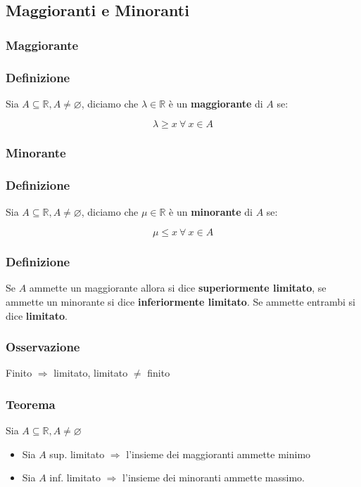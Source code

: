     \subsection{Maggioranti e Minoranti}
    \subsubsection{Maggiorante}
    \subsubsection*{Definizione}
    Sia $A \subseteq \mathbb{R}, A \neq \varnothing$, diciamo che $\lambda \in \mathbb{R}$ è un \textbf{maggiorante} di $A$ se:
    \begin{Large}
        \[
            \lambda \geq x\ \forall\ x \in A    
        \]
    \end{Large}
    \subsubsection{Minorante}
    \subsubsection*{Definizione}
    Sia $A \subseteq \mathbb{R}, A \neq \varnothing$, diciamo che $\mu \in \mathbb{R}$ è un \textbf{minorante} di $A$ se:
    \begin{Large}
        \[
            \mu \leq x\ \forall\ x \in A
        \]
    \end{Large}
    \subsubsection*{Definizione}
    Se $A$ ammette un maggiorante allora si dice \textbf{superiormente limitato}, se ammette un minorante
    si dice \textbf{inferiormente limitato}. Se ammette entrambi si dice \textbf{limitato}.

    \subsubsection*{Osservazione}
    Finito $\Rightarrow$ limitato, limitato $\neq$ finito
    \subsubsection*{Teorema}
    Sia $A \subseteq \mathbb{R}, A \neq \varnothing$
    \begin{itemize}
        \item Sia $A$ sup. limitato $\Rightarrow$ l'insieme dei maggioranti ammette minimo
        \item Sia $A$ inf. limitato $\Rightarrow$ l'insieme dei minoranti ammette massimo.
    \end{itemize}

